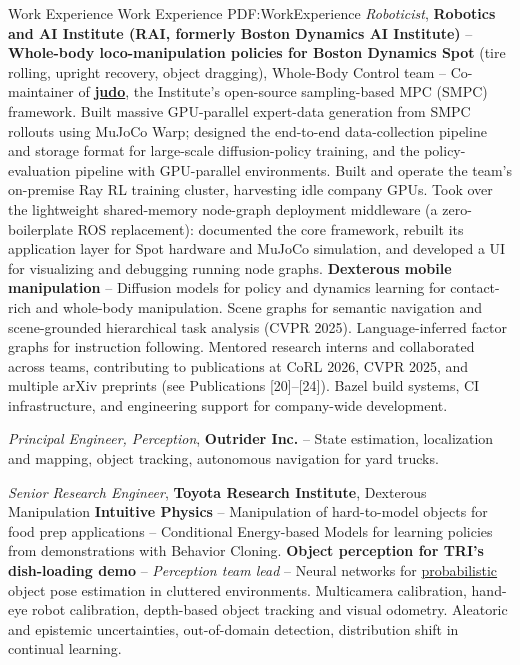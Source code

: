 \documentclass[letterpaper,MMMyyyy,nonstopmode]{simpleresumecv}
\begin{document}
\begin{Body}
\Section
{Work Experience}
{Work Experience}
{PDF:WorkExperience}
\Entry
{\textit{Roboticist}, \textbf{Robotics and AI Institute (RAI, formerly Boston Dynamics AI Institute)}}
\hfill
{} -- 
\Gap
\BulletItem
\textbf{Whole-body loco-manipulation policies for Boston Dynamics Spot} (tire rolling, upright recovery, object dragging), Whole-Body Control team
\hfill
{} -- 
\SubBulletItem
Co-maintainer of \href{https://github.com/bdaiinstitute/judo}{\textbf{judo}}, the Institute's open-source sampling-based MPC (SMPC) framework.
\SubBulletItem
Built massive GPU-parallel expert-data generation from SMPC rollouts using MuJoCo Warp; designed the end-to-end data-collection pipeline and storage format for large-scale diffusion-policy training, and the policy-evaluation pipeline with GPU-parallel environments.
\SubBulletItem
Built and operate the team's on-premise Ray RL training cluster, harvesting idle company GPUs.
\SubBulletItem
Took over the lightweight shared-memory node-graph deployment middleware (a zero-boilerplate ROS replacement): documented the core framework, rebuilt its application layer for Spot hardware and MuJoCo simulation, and developed a UI for visualizing and debugging running node graphs.
\Gap
\BulletItem
\textbf{Dexterous mobile manipulation}
\hfill
{} -- 
\SubBulletItem
Diffusion models for policy and dynamics learning for contact-rich and whole-body manipulation.
\SubBulletItem
Scene graphs for semantic navigation and scene-grounded hierarchical task analysis (CVPR 2025).
\SubBulletItem
Language-inferred factor graphs for instruction following.
\Gap
\BulletItem
Mentored research interns and collaborated across teams, contributing to publications at CoRL 2026, CVPR 2025, and multiple arXiv preprints (see Publications [20]--[24]).
\Gap
\BulletItem
Bazel build systems, CI infrastructure, and engineering support for company-wide development.

\BigGap
\Entry
{\textit{Principal Engineer, Perception}, \textbf{Outrider Inc.}}
\hfill
{} -- 
\Gap
\BulletItem
State estimation, localization and mapping, object tracking, autonomous navigation for yard trucks.

\BigGap
\Entry
{\textit{Senior Research Engineer}, \textbf{Toyota Research Institute}, Dexterous Manipulation}
\Gap
\BulletItem
\textbf{Intuitive Physics} -- Manipulation of hard-to-model objects for food prep applications
\hfill
{} -- 
\SubBulletItem
Conditional Energy-based Models for learning policies from demonstrations with Behavior Cloning.
\BulletItem
\textbf{Object perception for TRI's dish-loading demo} -- \textit{Perception team lead}
\hfill
{} -- 
\SubBulletItem
Neural networks for \underline{probabilistic} object pose estimation in cluttered environments.
\SubBulletItem
Multicamera calibration, hand-eye robot calibration, depth-based object tracking and visual odometry.
\SubBulletItem
Aleatoric and epistemic uncertainties, out-of-domain detection, distribution shift in continual learning.


\end{Body}
\end{document}
